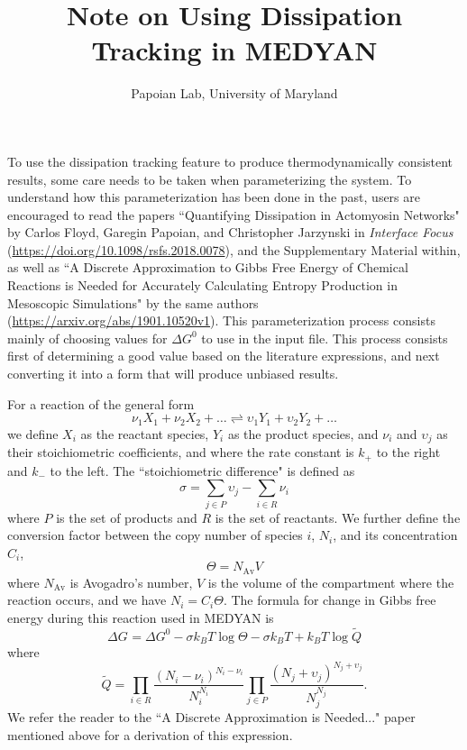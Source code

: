 \documentclass[11pt, oneside]{article}   	%
\title{Note on Using Dissipation Tracking in MEDYAN}
\author{Papoian Lab, University of Maryland}
\date{}							%
\begin{document}
\maketitle

To use the dissipation tracking feature to produce thermodynamically consistent results, some care needs to be taken when parameterizing the system.  To understand how this parameterization has been done in the past, users are encouraged to read the papers ``Quantifying Dissipation in Actomyosin Networks" by Carlos Floyd, Garegin Papoian, and Christopher Jarzynski in \textit{Interface Focus} (\url{https://doi.org/10.1098/rsfs.2018.0078}), and the Supplementary Material within, as well as ``A Discrete Approximation to Gibbs Free Energy of Chemical Reactions is Needed for Accurately Calculating Entropy Production in Mesoscopic Simulations" by the same authors (\url{https://arxiv.org/abs/1901.10520v1}).  This parameterization process consists mainly of choosing values for $\Delta G^0$ to use in the input file.  This process consists first of determining a good value based on the literature expressions, and next converting it into a form that will produce unbiased results.  


For a reaction of the general form 
\begin{equation}
\label{eq6}
\nu_1 X_1 + \nu_2 X_2 + \ldots \rightleftharpoons \upsilon_1 Y_1 + \upsilon_2 Y_2 + \ldots 
\end{equation}
we define $X_i$ as the reactant species, $Y_i$ as the product species, and $\nu_i$ and $\upsilon_j$ as their stoichiometric coefficients, and where the rate constant is $k_+$ to the right and $k_-$ to the left.  The ``stoichiometric difference" is defined as
\begin{equation}
\label{eq7}
\sigma = \sum_{j \in P} \upsilon_j - \sum_{i \in R} \nu_i 
\end{equation} 
where $P$ is the set of products and $R$ is the set of reactants.
We further define the conversion factor between the copy number of species $i$, $N_i$, and its concentration $C_i$,
\begin{equation}
\label{eq8}
\Theta = N_\text{Av} V
\end{equation}
where $N_\text{Av}$ is Avogadro's number, $V$ is the volume of the compartment where the reaction occurs, and we have $N_i = C_i \Theta$.  
The formula for change in Gibbs free energy during this reaction used in MEDYAN is
\begin{equation}
\Delta G_{} = \Delta G^0 - \sigma k_B T  \log{\Theta} - \sigma k_B T + k_B T \log{\widetilde{Q}} 
\label{eqa}
\end{equation}
where 
\begin{equation}
\widetilde{Q} = \prod_{i \in R} \frac{(N_i - \nu_i)^{N_i-\nu_i}}{N_i^{N_i}}  \prod_{j \in P} \frac{(N_j + \upsilon_j)^{N_j+\upsilon_j}}{N_j^{N_j}}.
\label{eqb}
\end{equation}
We refer the reader to the ``A Discrete Approximation is Needed..." paper mentioned above for a derivation of this expression.
\end{document}
